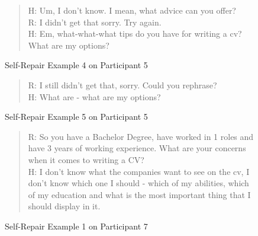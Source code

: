 \documentclass[11pt]{article}
\begin{document}
\begin{figure}[!h]
\begin{quote}
	H: Um, I don't know. I mean, what advice can you offer?\\
	R: I didn't get that sorry. Try again. \\
	H: Em, what-what-what tips do you have for writing a cv? What are my options?
	\caption{Self-Repair Example 4 on Participant 5}
	\label{selfrepair_45}
\end{quote}
\end{figure}

\begin{figure}[!h]
\begin{quote}
	R: I still didn't get that, sorry. Could you rephrase? \\
	H: What are - what are my options?
	\caption{Self-Repair Example 5 on Participant 5}
	\label{selfrepair_55}
\end{quote}
\end{figure}

\begin{figure}[!h]
\begin{quote}
	R: So you have a Bachelor Degree, have worked in 1 roles and have 3 years of working experience. What are your concerns when it comes to writing a CV?\\
	H: I don't know what the companies want to see on the cv, I don't know which one I should - which of my abilities, which of my education and what is the most important thing that I should display in it.
	\caption{Self-Repair Example 1 on Participant 7}
	\label{selfrepair_17}
\end{quote}
\end{figure}
\end{document}
